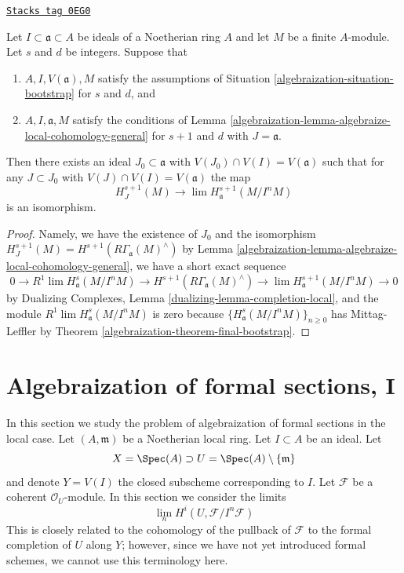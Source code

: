 \begin{lemma}
\label{algebraization-lemma-combine-two}
\href{https://stacks.math.columbia.edu/tag/0EG0}{\texttt{Stacks tag 0EG0}}

Let $I \subset \mathfrak a \subset A$ be ideals of a Noetherian ring $A$
and let $M$ be a finite $A$-module. Let $s$ and $d$ be integers.
Suppose that
\begin{enumerate}
\item $A, I, V(\mathfrak a), M$ satisfy the assumptions of
Situation \ref{algebraization-situation-bootstrap} for $s$ and $d$, and
\item $A, I, \mathfrak a, M$ satisfy the conditions of
Lemma \ref{algebraization-lemma-algebraize-local-cohomology-general}
for $s + 1$ and $d$ with $J = \mathfrak a$.
\end{enumerate}
Then there exists an ideal
$J_0 \subset \mathfrak a$ with $V(J_0) \cap V(I) = V(\mathfrak a)$
such that for any $J \subset J_0$ with $V(J) \cap V(I) = V(\mathfrak a)$
the map
$$
H^{s + 1}_J(M) \longrightarrow \lim H^{s + 1}_\mathfrak a(M/I^nM)
$$
is an isomorphism.
\end{lemma}

\begin{proof}

Namely, we have the existence of $J_0$
and the isomorphism
$H^{s + 1}_J(M) = H^{s + 1}(R\Gamma_\mathfrak a(M)^\wedge)$
by Lemma \ref{algebraization-lemma-algebraize-local-cohomology-general},
we have a short exact sequence
$$
0 \to R^1\lim H^s_\mathfrak a(M/I^nM) \to
H^{s + 1}(R\Gamma_\mathfrak a(M)^\wedge) \to
\lim H^{s + 1}_\mathfrak a(M/I^nM) \to 0
$$
by Dualizing Complexes, Lemma \ref{dualizing-lemma-completion-local},
and the module $R^1\lim H^s_\mathfrak a(M/I^nM)$ is zero because
$\{H^s_\mathfrak a(M/I^nM)\}_{n \geq 0}$ has Mittag-Leffler
by Theorem \ref{algebraization-theorem-final-bootstrap}.
\end{proof}

\section{Algebraization of formal sections, I}
\label{algebraization-section-algebraization-sections}
In this section we study the problem of algebraization of
formal sections in the local case.
Let $(A, \mathfrak m)$ be a Noetherian local ring.
Let $I \subset A$ be an ideal. Let
$$
X = \Spec(A) \supset U = \Spec(A) \setminus \{\mathfrak m\}
$$
and denote $Y = V(I)$ the closed subscheme corresponding to $I$.
Let $\mathcal{F}$ be a coherent $\mathcal{O}_U$-module.
In this section we consider the limits
$$
\lim_n H^i(U, \mathcal{F}/I^n\mathcal{F})
$$
This is closely related to the cohomology of the pullback
of $\mathcal{F}$ to the formal completion of $U$ along $Y$;
however, since we have not yet introduced formal schemes,
we cannot use this terminology here.

